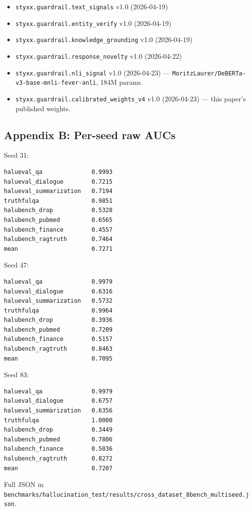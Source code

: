 \documentclass[
  11pt]{article}
\providecommand{\tightlist}{%
  \setlength{\itemsep}{0pt}\setlength{\parskip}{0pt}}
\begin{document}
\begin{itemize}
\tightlist
\item
  \texttt{styxx.guardrail.text\_signals} v1.0 (2026-04-19)
\item
  \texttt{styxx.guardrail.entity\_verify} v1.0 (2026-04-19)
\item
  \texttt{styxx.guardrail.knowledge\_grounding} v1.0 (2026-04-19)
\item
  \texttt{styxx.guardrail.response\_novelty} v1.0 (2026-04-22)
\item
  \texttt{styxx.guardrail.nli\_signal} v1.0 (2026-04-23) ---
  \texttt{MoritzLaurer/DeBERTa-v3-base-mnli-fever-anli}, 184M params.
\item
  \texttt{styxx.guardrail.calibrated\_weights\_v4} v1.0 (2026-04-23) ---
  this paper's published weights.
\end{itemize}

\subsection{Appendix B: Per-seed raw
AUCs}\label{appendix-b-per-seed-raw-aucs}

Seed 31:

\begin{verbatim}
halueval_qa              0.9993
halueval_dialogue        0.7215
halueval_summarization   0.7194
truthfulqa               0.9851
halubench_drop           0.5328
halubench_pubmed         0.6565
halubench_finance        0.4557
halubench_ragtruth       0.7464
mean                     0.7271
\end{verbatim}

Seed 47:

\begin{verbatim}
halueval_qa              0.9979
halueval_dialogue        0.6316
halueval_summarization   0.5732
truthfulqa               0.9964
halubench_drop           0.3936
halubench_pubmed         0.7209
halubench_finance        0.5157
halubench_ragtruth       0.8463
mean                     0.7095
\end{verbatim}

Seed 83:

\begin{verbatim}
halueval_qa              0.9979
halueval_dialogue        0.6757
halueval_summarization   0.6356
truthfulqa               1.0000
halubench_drop           0.3449
halubench_pubmed         0.7806
halubench_finance        0.5036
halubench_ragtruth       0.8272
mean                     0.7207
\end{verbatim}

Full JSON in
\texttt{benchmarks/hallucination\_test/results/cross\_dataset\_8bench\_multiseed.json}.
\end{document}
